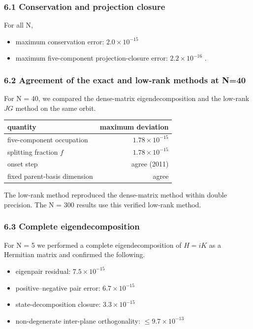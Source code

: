 \documentclass[
  a4paper,
]{article}
\newcounter{none} %
\providecommand{\tightlist}{%
  \setlength{\itemsep}{0pt}\setlength{\parskip}{0pt}}
\begin{document}
\subsubsection{6.1 Conservation and projection
closure}\label{conservation-and-projection-closure}

For all N,

\begin{itemize}
\tightlist
\item
  maximum conservation error: \(2.0\times10^{-15}\)
\item
  maximum five-component projection-closure error: \(2.2\times10^{-16}\)
  .
\end{itemize}

\subsubsection{6.2 Agreement of the exact and low-rank methods at
N=40}\label{agreement-of-the-exact-and-low-rank-methods-at-n40}

For N = 40, we compared the dense-matrix eigendecomposition and the
low-rank \(JG\) method on the same orbit.

{\def\LTcaptype{none} %
\begin{longtable}[]{@{}lr@{}}
\toprule\noalign{}
quantity & maximum deviation \\
\midrule\noalign{}
\endhead
\bottomrule\noalign{}
\endlastfoot
five-component occupation & \(1.78\times10^{-15}\) \\
splitting fraction \(f\) & \(1.78\times10^{-15}\) \\
onset step & agree (2011) \\
fixed parent-basis dimension & agree \\
\end{longtable}
}

The low-rank method reproduced the dense-matrix method within double
precision. The N = 300 results use this verified low-rank method.

\subsubsection{6.3 Complete
eigendecomposition}\label{complete-eigendecomposition}

For N = 5 we performed a complete eigendecomposition of \(H=iK\) as a
Hermitian matrix and confirmed the following.

\begin{itemize}
\tightlist
\item
  eigenpair residual: \(7.5\times10^{-15}\)
\item
  positive--negative pair error: \(6.7\times10^{-15}\)
\item
  state-decomposition closure: \(3.3\times10^{-15}\)
\item
  non-degenerate inter-plane orthogonality: \(\le 9.7\times10^{-13}\)
\end{itemize}
\end{document}
